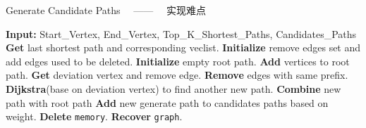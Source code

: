 \begin{algorithm}
    \caption{Generate Candidate Paths \ \ —— \ \ 实现难点}
    \begin{algorithmic}[1]
    \State \textbf{Input:} Start\_Vertex, End\_Vertex, Top\_K\_Shortest\_Paths, Candidates\_Paths
    \State \textbf{Get} last shortest path and corresponding veclist. 
    \State \textbf{Initialize} remove edges set and add edges used to be deleted.
        \State \textbf{Initialize} empty root path.
        \State \textbf{Add} vertices to root path.
        \State \textbf{Get} deviation vertex and remove edge.
        \State \textbf{Remove} edges with same prefix.
        \State \textbf{Dijkstra}(base on deviation vertex) to find another new path.
        \State \textbf{Combine} new path with root path
        \State \textbf{Add} new generate path to candidates paths based on weight.
        \State \textbf{Delete} \texttt{memory}.
    \EndFor
    \State \textbf{Recover} \texttt{graph}.
    \end{algorithmic}
\end{algorithm}